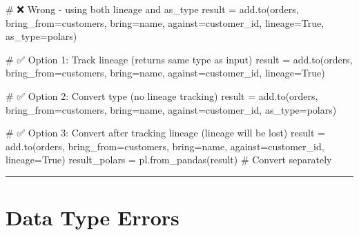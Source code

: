 \documentclass[
  letterpaper,
]{scrbook}
\newenvironment{Shaded}{\begin{snugshade}}{\end{snugshade}}
\newcommand{\CommentTok}[1]{\textcolor[rgb]{0.37,0.37,0.37}{#1}}
\newcommand{\NormalTok}[1]{\textcolor[rgb]{0.00,0.23,0.31}{#1}}
\newcommand{\OperatorTok}[1]{\textcolor[rgb]{0.37,0.37,0.37}{#1}}
\newcommand{\StringTok}[1]{\textcolor[rgb]{0.13,0.47,0.30}{#1}}
\newcommand{\VariableTok}[1]{\textcolor[rgb]{0.07,0.07,0.07}{#1}}
\begin{document}
\begin{Shaded}
\begin{Highlighting}[]
\CommentTok{\# ❌ Wrong {-} using both lineage and as\_type}
\NormalTok{result }\OperatorTok{=}\NormalTok{ add.to(orders, bring\_from}\OperatorTok{=}\NormalTok{customers, bring}\OperatorTok{=}\StringTok{\textquotesingle{}name\textquotesingle{}}\NormalTok{, }
\NormalTok{                against}\OperatorTok{=}\StringTok{\textquotesingle{}customer\_id\textquotesingle{}}\NormalTok{, lineage}\OperatorTok{=}\VariableTok{True}\NormalTok{, as\_type}\OperatorTok{=}\StringTok{\textquotesingle{}polars\textquotesingle{}}\NormalTok{)}

\CommentTok{\# ✅ Option 1: Track lineage (returns same type as input)}
\NormalTok{result }\OperatorTok{=}\NormalTok{ add.to(orders, bring\_from}\OperatorTok{=}\NormalTok{customers, bring}\OperatorTok{=}\StringTok{\textquotesingle{}name\textquotesingle{}}\NormalTok{, }
\NormalTok{                against}\OperatorTok{=}\StringTok{\textquotesingle{}customer\_id\textquotesingle{}}\NormalTok{, lineage}\OperatorTok{=}\VariableTok{True}\NormalTok{)}

\CommentTok{\# ✅ Option 2: Convert type (no lineage tracking)}
\NormalTok{result }\OperatorTok{=}\NormalTok{ add.to(orders, bring\_from}\OperatorTok{=}\NormalTok{customers, bring}\OperatorTok{=}\StringTok{\textquotesingle{}name\textquotesingle{}}\NormalTok{, }
\NormalTok{                against}\OperatorTok{=}\StringTok{\textquotesingle{}customer\_id\textquotesingle{}}\NormalTok{, as\_type}\OperatorTok{=}\StringTok{\textquotesingle{}polars\textquotesingle{}}\NormalTok{)}

\CommentTok{\# ✅ Option 3: Convert after tracking lineage (lineage will be lost)}
\NormalTok{result }\OperatorTok{=}\NormalTok{ add.to(orders, bring\_from}\OperatorTok{=}\NormalTok{customers, bring}\OperatorTok{=}\StringTok{\textquotesingle{}name\textquotesingle{}}\NormalTok{, }
\NormalTok{                against}\OperatorTok{=}\StringTok{\textquotesingle{}customer\_id\textquotesingle{}}\NormalTok{, lineage}\OperatorTok{=}\VariableTok{True}\NormalTok{)}
\NormalTok{result\_polars }\OperatorTok{=}\NormalTok{ pl.from\_pandas(result)  }\CommentTok{\# Convert separately}
\end{Highlighting}
\end{Shaded}

\begin{center}\rule{0.5\linewidth}{0.5pt}\end{center}

\section{Data Type Errors}\label{data-type-errors}
\end{document}
